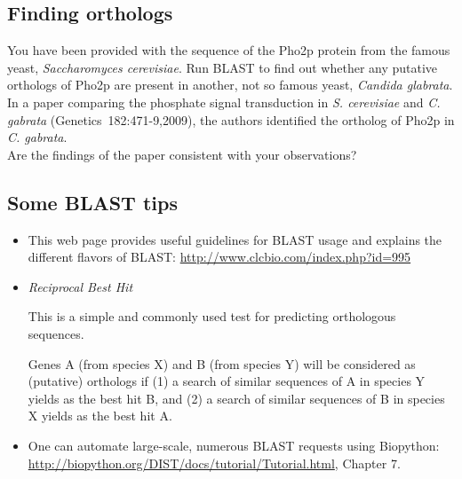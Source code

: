 \documentclass[a4paper,11pt]{article}
\begin{document}
\subsection{Finding orthologs}

You have been provided with the sequence of the Pho2p protein from the famous yeast, \emph{Saccharomyces cerevisiae}. Run BLAST to find out whether any putative orthologs of Pho2p are present in another, not so famous yeast, \emph{Candida glabrata}.\\

In a paper comparing the phosphate signal transduction in \emph{S. cerevisiae} and \emph{C. gabrata} (\mbox{Genetics 182:471-9,2009}), the authors identified the ortholog of Pho2p in \emph{C. gabrata}. \\

Are the findings of the paper consistent with your observations?

\subsection{Some BLAST tips}

\begin{itemize}
\item This web page provides useful guidelines for BLAST usage and explains the different flavors of BLAST:
\url{http://www.clcbio.com/index.php?id=995}

\item \emph{Reciprocal Best Hit}

This is a simple and commonly used test for predicting orthologous sequences.

Genes A (from species X) and B (from species Y) will be considered as (putative) orthologs if (1) a search of similar sequences of A in species Y yields as the best hit B, and (2) a search of similar sequences of B in species X yields as the best hit A.

\item One can automate large-scale, numerous BLAST requests using Biopython: \\
	\url{http://biopython.org/DIST/docs/tutorial/Tutorial.html}, Chapter 7.
\end{itemize}
\end{document}
